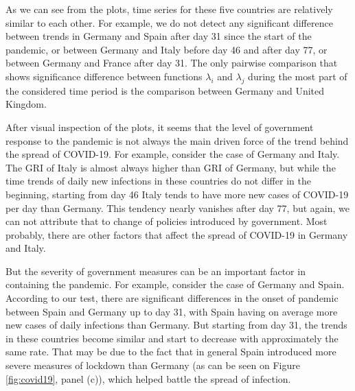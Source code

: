 \documentclass[a4paper,12pt]{article}
\numberwithin{equation}{section}
\begin{document}
As we can see from the plots, time series for these five countries are relatively similar to each other. For example, we do not detect any significant difference between trends in Germany and Spain after day 31 since the start of the pandemic, or between Germany and Italy before day 46 and after day 77, or between Germany and France after day 31. The only pairwise comparison that shows significance difference between functions $\lambda_i$ and $\lambda_j$ during the most part of the considered time period is the comparison between Germany and United Kingdom.

After visual inspection of the plots, it seems that the level of government response to the pandemic is not always the main driven force of the trend behind the spread of COVID-19. For example, consider the case of Germany and Italy. The GRI of Italy is almost always higher than GRI of Germany, but while the time trends of daily new infections in these countries do not differ in the beginning, starting from day 46 Italy tends to have more new cases of COVID-19 per day than Germany. This tendency nearly vanishes after day 77, but again, we can not attribute that to change of policies introduced by government. Most probably, there are other factors that affect the spread of COVID-19 in Germany and Italy.

But the severity of government measures can be an important factor in containing the pandemic. For example, consider the case of Germany and Spain. According to our test, there are significant differences in the onset of pandemic between Spain and Germany up to day 31, with Spain having on average more new cases of daily infections than Germany. But starting from day 31, the trends in these countries become similar and start to decrease with approximately the same rate. That may be due to the fact that in general Spain introduced more severe measures of lockdown than Germany (as can be seen on Figure \ref{fig:covid19}, panel (c)), which helped battle the spread of infection.
\end{document}
